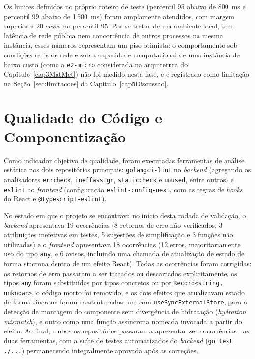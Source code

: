 Os limites definidos no próprio roteiro de teste (percentil 95 abaixo de 800~ms e percentil 99 abaixo de 1\,500~ms) foram amplamente atendidos, com margem superior a 20 vezes no percentil 95. Por se tratar de um ambiente local, sem latência de rede pública nem concorrência de outros processos na mesma instância, esses números representam um piso otimista: o comportamento sob condições reais de rede e sob a capacidade computacional de uma instância de baixo custo (como a \texttt{e2-micro} considerada na arquitetura do Capítulo~\ref{cap3MatMet}) não foi medido nesta fase, e é registrado como limitação na Seção~\ref{sec:limitacoes} do Capítulo~\ref{cap5Discussao}.

\section{Qualidade do Código e Componentização}
\label{sec:qualidade-codigo}

Como indicador objetivo de qualidade, foram executadas ferramentas de análise estática nos dois repositórios principais: \texttt{golangci-lint} no \textit{backend} (agregando os analisadores \texttt{errcheck}, \texttt{ineffassign}, \texttt{staticcheck} e \texttt{unused}, entre outros) e \texttt{eslint} no \textit{frontend} (configuração \texttt{eslint-config-next}, com as regras de \textit{hooks} do React e \texttt{@typescript-eslint}).

No estado em que o projeto se encontrava no início desta rodada de validação, o \textit{backend} apresentava 19 ocorrências (8 retornos de erro não verificados, 3 atribuições inefetivas em testes, 5 sugestões de simplificação e 3 funções não utilizadas) e o \textit{frontend} apresentava 18 ocorrências (12 erros, majoritariamente uso do tipo \texttt{any}, e 6 avisos, incluindo uma chamada de atualização de estado de forma síncrona dentro de um efeito React). Todas as ocorrências foram corrigidas: os retornos de erro passaram a ser tratados ou descartados explicitamente, os tipos \texttt{any} foram substituídos por tipos concretos ou por \texttt{Record\textless string, unknown\textgreater}, o código morto foi removido, e os dois efeitos que atualizavam estado de forma síncrona foram reestruturados: um com \texttt{useSyncExternalStore}, para a detecção de montagem do componente sem divergência de hidratação (\textit{hydration mismatch}), e outro como uma função assíncrona nomeada invocada a partir do efeito. Ao final, ambos os repositórios passaram a apresentar zero ocorrências nas duas ferramentas, com a suíte de testes automatizados do \textit{backend} (\texttt{go test ./\allowbreak{}...}) permanecendo integralmente aprovada após as correções.

